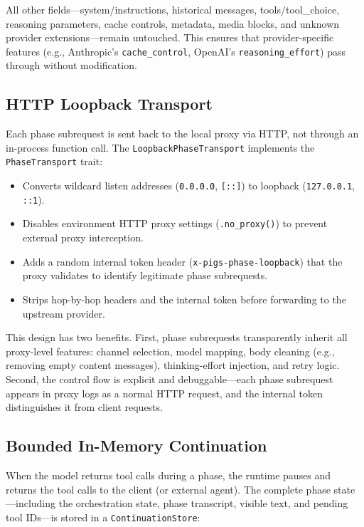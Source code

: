 All other fields---system/instructions, historical messages, tools/tool\_choice, reasoning parameters, cache controls, metadata, media blocks, and unknown provider extensions---remain untouched. This ensures that provider-specific features (e.g., Anthropic's \texttt{cache\_control}, OpenAI's \texttt{reasoning\_effort}) pass through without modification.

\subsection{HTTP Loopback Transport}
\label{sec:loopback}

Each phase subrequest is sent back to the local proxy via HTTP, not through an in-process function call. The \texttt{LoopbackPhaseTransport} implements the \texttt{PhaseTransport} trait:

\begin{itemize}[nosep]
    \item Converts wildcard listen addresses (\texttt{0.0.0.0}, \texttt{[::]}) to loopback (\texttt{127.0.0.1}, \texttt{::1}).
    \item Disables environment HTTP proxy settings (\texttt{.no\_proxy()}) to prevent external proxy interception.
    \item Adds a random internal token header (\texttt{x-pigs-phase-loopback}) that the proxy validates to identify legitimate phase subrequests.
    \item Strips hop-by-hop headers and the internal token before forwarding to the upstream provider.
\end{itemize}

This design has two benefits. First, phase subrequests transparently inherit all proxy-level features: channel selection, model mapping, body cleaning (e.g., removing empty content messages), thinking-effort injection, and retry logic. Second, the control flow is explicit and debuggable---each phase subrequest appears in proxy logs as a normal HTTP request, and the internal token distinguishes it from client requests.

\subsection{Bounded In-Memory Continuation}
\label{sec:continuation}

When the model returns tool calls during a phase, the runtime pauses and returns the tool calls to the client (or external agent). The complete phase state---including the orchestration state, phase transcript, visible text, and pending tool IDs---is stored in a \texttt{ContinuationStore}:

